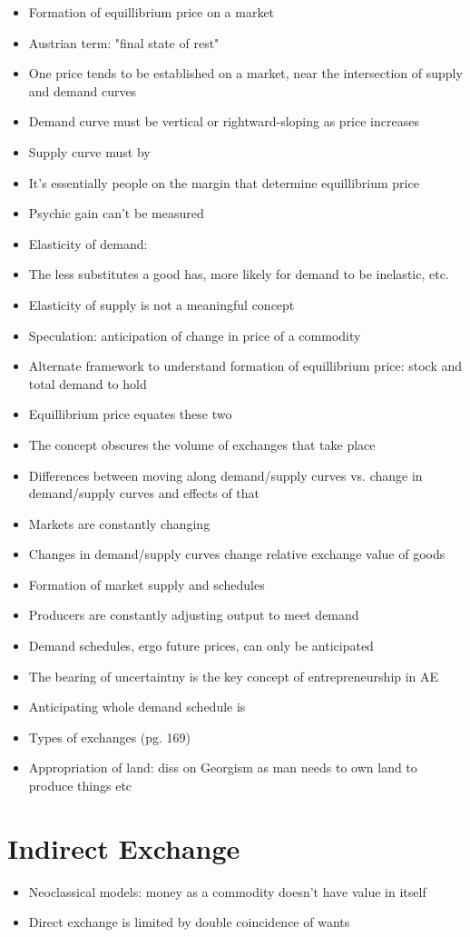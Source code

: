 \documentclass[]{article}
\begin{document}
\begin{itemize}
    \item Formation of equillibrium price on a market
    \item Austrian term: "final state of rest"
    \item One price tends to be established on a market, near the intersection of supply and demand curves
    \item Demand curve must be vertical or rightward-sloping as price increases
    \item Supply curve must by 
    \item It's essentially people on the margin that determine equillibrium price
    \item Psychic gain can't be measured
    \item Elasticity of demand: 
    \item The less substitutes a good has, more likely for demand to be inelastic, etc.
    \item Elasticity of supply is not a meaningful concept
    \item Speculation: anticipation of change in price of a commodity
    \item Alternate framework to understand formation of equillibrium price: stock and total demand to hold
    \item Equillibrium price equates these two
    \item The concept obscures the volume of exchanges that take place
    \item Differences between moving along demand/supply curves vs. change in demand/supply curves and effects of that
    \item Markets are constantly changing
    \item Changes in demand/supply curves change relative exchange value of goods
    \item Formation of market supply and schedules
    \item Producers are constantly adjusting output to meet demand
    \item Demand schedules, ergo future prices, can only be anticipated
    \item The bearing of uncertaintny is the key concept of entrepreneurship in AE
    \item Anticipating whole demand schedule is ~
    \item Types of exchanges (pg. 169)
    \item Appropriation of land: diss on Georgism as man needs to own land to produce things etc
    
\end{itemize}

\newpage

\section{Indirect Exchange}

\begin{itemize}
    \item Neoclassical models: money as a commodity doesn't have value in itself
    \item Direct exchange is limited by double coincidence of wants
\end{itemize}
\end{document}
